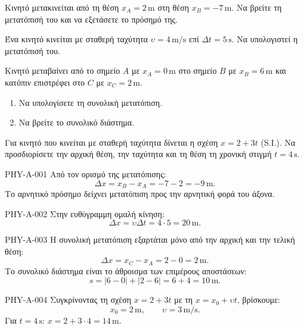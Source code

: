 \begin{enumerate}[leftmargin=6mm]
\end{enumerate}
\begin{exercise}[PHY-A-001]{}
Κινητό μετακινείται από τη θέση \(x_A=2\,\mathrm{m}\) στη θέση \(x_B=-7\,\mathrm{m}\). Να βρείτε τη μετατόπισή του και να εξετάσετε το πρόσημό της.
\end{exercise}
\begin{exercise}[PHY-A-002]{}
Ένα κινητό κινείται με σταθερή ταχύτητα \(\upsilon=4\,\mathrm{m/s}\) επί \(\Delta t=5\,\mathrm{s}\). Να υπολογιστεί η μετατόπισή του.
\end{exercise}
\begin{exercise}[PHY-A-003]{}
Κινητό μεταβαίνει από το σημείο \(A\) με \(x_A=0\,\mathrm{m}\) στο σημείο \(B\) με \(x_B=6\,\mathrm{m}\) και κατόπιν επιστρέφει στο \(C\) με \(x_C=2\,\mathrm{m}\).
\begin{enumerate}[label=\BookGreek*)]
\item Να υπολογίσετε τη συνολική μετατόπιση.
\item Να βρείτε το συνολικό διάστημα.
\end{enumerate}
\end{exercise}
\begin{exercise}[PHY-A-004]{}
Για κινητό που κινείται με σταθερή ταχύτητα δίνεται η σχέση \(x=2+3t\) (S.I.). Να προσδιορίσετε την αρχική θέση, την ταχύτητα και τη θέση τη χρονική στιγμή \(t=4\,\mathrm{s}\).
\end{exercise}
\clearpage
{}
\begin{booksolution}{PHY-A-001}
Από τον ορισμό της μετατόπισης:
\[\Delta x=x_B-x_A=-7-2=-9\,\mathrm{m}.\]
Το αρνητικό πρόσημο δείχνει μετατόπιση προς την αρνητική φορά του άξονα.
\end{booksolution}
\begin{booksolution}{PHY-A-002}
Στην ευθύγραμμη ομαλή κίνηση:
\[\Delta x=\upsilon\Delta t=4\cdot5=20\,\mathrm{m}.\]
\end{booksolution}
\begin{booksolution}{PHY-A-003}
 Η συνολική μετατόπιση εξαρτάται μόνο από την αρχική και την τελική θέση:
\[\Delta x=x_C-x_A=2-0=2\,\mathrm{m}.\]
 Το συνολικό διάστημα είναι το άθροισμα των επιμέρους αποστάσεων:
\[s=|6-0|+|2-6|=6+4=10\,\mathrm{m}.\]
\end{booksolution}
\begin{booksolution}{PHY-A-004}
Συγκρίνοντας τη σχέση \(x=2+3t\) με τη \(x=x_0+\upsilon t\), βρίσκουμε:
\[x_0=2\,\mathrm{m},\qquad\upsilon=3\,\mathrm{m/s}.\]
Για \(t=4\,\mathrm{s}\): \(x=2+3\cdot 4=14\,\mathrm{m}\).
\end{booksolution}
